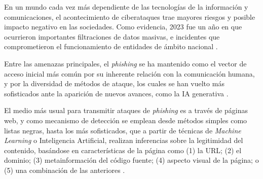 
En un mundo cada vez más dependiente de las tecnologías de la información y comunicaciones, el acontecimiento de ciberataques trae mayores riesgos y posible impacto negativo en las sociedades. Como evidencia, 2023 fue un año en que ocurrieron importantes filtraciones de datos masivas, e incidentes que comprometieron el funcionamiento de entidades de ámbito nacional \cite{moore2023}.

Entre las amenazas principales, el \textit{phishing} se ha mantenido como el vector de acceso inicial más común por su inherente relación con la comunicación humana, y por la diversidad de métodos de ataque, los cuales se han vuelto más sofisticados ante la aparición de nuevos avances, como la IA generativa \cite{enisa2023}.

El medio más usual para transmitir ataques de \textit{phishing} es a través de páginas web, y como mecanismo de detección se emplean desde métodos simples como listas negras, hasta los más sofisticados, que a partir de técnicas de \textit{Machine Learning} o Inteligencia Artificial, realizan inferencias sobre la legitimidad del contenido, basándose en características de la página como (1) la URL; (2) el dominio; (3) metainformación del código fuente; (4) aspecto visual de la página; o (5) una combinación de las anteriores \cite{castaño2021}.

